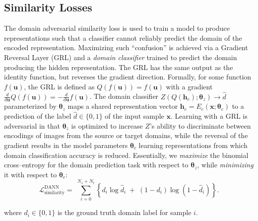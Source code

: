 \documentclass{article}
\newcommand{\bs}[1]{\boldsymbol{\mathbf{#1}}}
\begin{document}
\subsection{Similarity Losses}
\label{sec:similarity_loss}
The domain adversarial similarity loss \cite{ganin2014unsupervised,ganin2016domain}
is used to train a model to produce representations such that a classifier cannot
reliably predict the domain of the encoded representation.
Maximizing such ``confusion'' is achieved via a Gradient Reversal Layer (GRL)
and a \textit{domain classifier} trained to predict the domain producing the
hidden representation.
The GRL has the same output as the identity function,
but reverses the gradient direction. Formally, for some function $f(\bs u)$, the GRL
is defined as $Q\left(f(\bs u)\right) = f(\bs u)$ with a gradient ${\frac{d}{d\bs u}Q(f(\bs u))=-\frac{d}{d\bs u}f(\bs u)}$.
The domain classifier $Z(Q(\bs h_c); \bs \theta_z) \rightarrow \hat{d}$
parameterized by $\bs \theta_z$ maps a shared representation vector
$\bs h_c=E_c(\bs x ; \bs \theta_c)$ to a prediction of the label $\hat{d} \in \{0,1\}$ of the
input sample ${\bs x}$. Learning with a GRL is adversarial in that $\bs \theta_z$ is
optimized to increase $Z$'s ability to discriminate between encodings of images from
the source or target domains, while the reversal of the gradient results in the model
parameters $\bs \theta_c$ learning representations from which domain classification
accuracy is reduced.
Essentially, we \textsl{maximize} the binomial cross--entropy for the domain prediction task with respect to $\bs \theta_z$, while \textsl{minimizing} it with respect to $\bs \theta_c$: 
\begin{equation}
\label{eq:dann}
\mathcal {L}_\mathrm{similarity}^\mathrm{DANN} = \;\sum_{i=0}^{N_s+N_t} \left\{d_i \log \hat{d}_i \;+\;  (1-d_i) \log(1- \hat{d}_i)\right \}.
\end{equation}

where $d_i \in \{0,1\}$ is the ground truth domain label for sample $i$.
\end{document}
